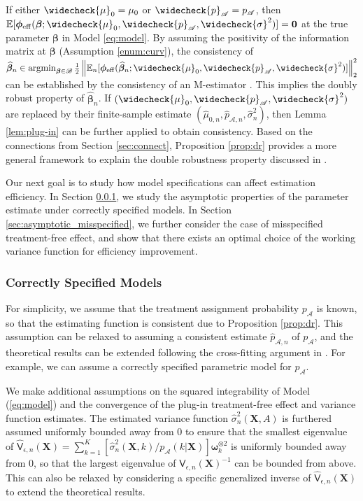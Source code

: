\documentclass[11pt]{article}
\theoremstyle{definition}
\theoremstyle{remark}
\newcommand{\bX}{\bm{X}}
\newcommand{\bbeta}{\bm{\beta}}
\newcommand{\bomega}{\bm{\omega}}
\newcommand{\bphi}{\bm{\phi}}
\newcommand{\bbE}{\mathbb{E}}
\newcommand{\sA}{\mathscr{A}}
\newcommand{\sB}{\mathscr{B}}
\newcommand{\sfV}{\mathsf{V}}
\newcommand{\argmin}{\mathop{\mathrm{argmin}}}
\newcommand{\bzero}{\mathbf{0}}	%
\newcommand{\eff}{\mathrm{eff}}
\begin{document}
If either $ \widecheck{\mu}_{0} = \mu_{0} $ or $ \widecheck{p}_{\sA} = p_{\sA} $, then $ \bbE[ \bphi_{\eff}(\bbeta;\widecheck{\mu}_{0},\widecheck{p}_{\sA},\widecheck{\sigma}^{2})] = \bzero $ at the true parameter $ \bbeta $ in Model \eqref{eq:model}. By assuming the positivity of the information matrix at $ \bbeta $ (Assumption \ref{enum:curv}), the consistency of $ \widehat{\bbeta}_{n} \in \argmin_{\bbeta \in \sB} {1 \over 2}\left\| \bbE_{n}[\bphi_{\eff}(\widehat{\bbeta}_{n};\widecheck{\mu}_{0},\widecheck{p}_{\sA},\widecheck{\sigma}^{2})] \right\|_{2}^{2} $ can be established by the consistency of an M-estimator \citep[Corollary 3.2.3]{van1996weak}. This implies the doubly robust property of $ \widehat{\bbeta}_{n} $. If $ (\widecheck{\mu}_{0},\widecheck{p}_{\sA},\widecheck{\sigma}^{2}) $ are replaced by their finite-sample estimate $ (\widehat{\mu}_{0,n},\widehat{p}_{\sA,n},\widehat{\sigma}_{n}^{2}) $, then Lemma \ref{lem:plug-in} can be further applied to obtain consistency. Based on the connections from Section \ref{sec:connect}, Proposition \ref{prop:dr} provides a more general framework to explain the double robustness property discussed in \citet{robins2004optimal,lu2013variable,wallace2015doubly,meng2020robust}.

Our next goal is to study how model specifications can affect estimation efficiency. In Section \ref{sec:asymptotic_correct}, we study the asymptotic properties of the parameter estimate under correctly specified models. In Section \ref{sec:asymptotic_misspecified}, we further consider the case of misspecified treatment-free effect, and show that there exists an optimal choice of the working variance function for efficiency improvement.

\subsubsection{Correctly Specified Models}\label{sec:asymptotic_correct}

For simplicity, we assume that the treatment assignment probability $ p_{\sA} $ is known, so that the estimating function is consistent due to Proposition \ref{prop:dr}. This assumption can be relaxed to assuming a consistent estimate $ \widehat{p}_{\sA,n} $ of $ p_{\sA} $, and the theoretical results can be extended following the cross-fitting argument in \citet{ertefaie2021robust}. For example, we can assume a correctly specified parametric model for $ p_{\sA} $. 

We make additional assumptions on the squared integrability of Model (\ref{eq:model}) and the convergence of the plug-in treatment-free effect and variance function estimates. The estimated variance function $ \widehat{\sigma}_{n}^{2}(\bX,A) $ is furthered assumed uniformly bounded away from 0 to ensure that the smallest eigenvalue of $ \widehat{\sfV}_{\epsilon,n}(\bX) = \sum_{k=1}^{K}[\widehat{\sigma}_{n}^{2}(\bX,k)/p_{\sA}(k|\bX)]\bomega_{k}^{\otimes 2} $ is uniformly bounded away from 0, so that the largest eigenvalue of $ \widehat{\sfV}_{\epsilon,n}(\bX)^{-1} $ can be bounded from above. This can also be relaxed by considering a specific generalized inverse of $ \widehat{\sfV}_{\epsilon,n}(\bX) $ to extend the theoretical results.
\end{document}
